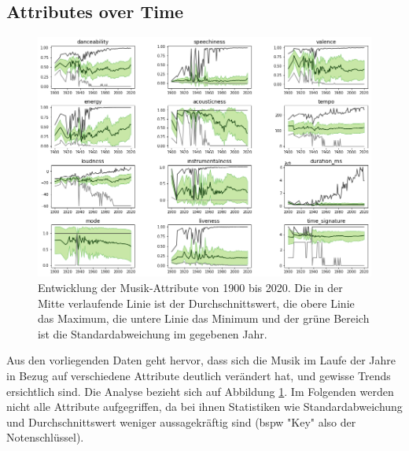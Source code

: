 \documentclass[conference]{IEEEtran}
\begin{document}
\subsection{Attributes over Time}
\begin{figure}[t]
\centering
\includegraphics[width=\textwidth]{images/over_time.png}
\caption{Entwicklung der Musik-Attribute von 1900 bis 2020. Die in der Mitte verlaufende Linie ist der Durchschnittswert, die obere Linie das Maximum, die untere Linie das Minimum und der grüne Bereich ist die Standardabweichung im gegebenen Jahr.}
\label{time}
\end{figure}
Aus den vorliegenden Daten geht hervor, dass sich die Musik im Laufe der Jahre in Bezug auf verschiedene Attribute deutlich verändert hat, und gewisse Trends ersichtlich sind. Die Analyse bezieht sich auf Abbildung \ref{time}. Im Folgenden werden nicht alle Attribute aufgegriffen, da bei ihnen Statistiken wie Standardabweichung und Durchschnittswert weniger aussagekräftig sind (bspw "Key" also der Notenschlüssel).
\end{document}

